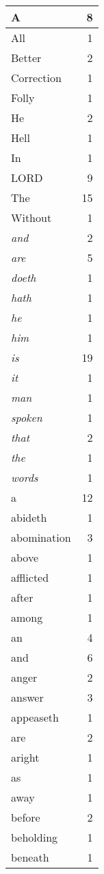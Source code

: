 \begin{center}
\begin{longtable}{l|r}
A & 8\\ \hline 
All & 1\\ \hline 
Better & 2\\ \hline 
Correction & 1\\ \hline 
Folly & 1\\ \hline 
He & 2\\ \hline 
Hell & 1\\ \hline 
In & 1\\ \hline 
LORD & 9\\ \hline 
The & 15\\ \hline 
Without & 1\\ \hline 
\emph{and} & 2\\ \hline 
\emph{are} & 5\\ \hline 
\emph{doeth} & 1\\ \hline 
\emph{hath} & 1\\ \hline 
\emph{he} & 1\\ \hline 
\emph{him} & 1\\ \hline 
\emph{is} & 19\\ \hline 
\emph{it} & 1\\ \hline 
\emph{man} & 1\\ \hline 
\emph{spoken} & 1\\ \hline 
\emph{that} & 2\\ \hline 
\emph{the} & 1\\ \hline 
\emph{words} & 1\\ \hline 
a & 12\\ \hline 
abideth & 1\\ \hline 
abomination & 3\\ \hline 
above & 1\\ \hline 
afflicted & 1\\ \hline 
after & 1\\ \hline 
among & 1\\ \hline 
an & 4\\ \hline 
and & 6\\ \hline 
anger & 2\\ \hline 
answer & 3\\ \hline 
appeaseth & 1\\ \hline 
are & 2\\ \hline 
aright & 1\\ \hline 
as & 1\\ \hline 
away & 1\\ \hline 
before & 2\\ \hline 
beholding & 1\\ \hline 
beneath & 1\\ \hline 

\end{longtable}
\end{center}
